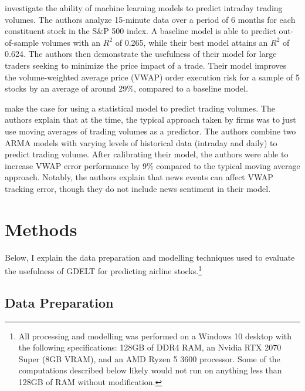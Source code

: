 \documentclass[12pt]{article}
\begin{document}
\cite{cucuringu2025forecasting} investigate the ability of machine learning models to predict intraday trading volumes. The authors analyze 15-minute data over a period of 6 months for each constituent stock in the S\&P 500 index. A baseline model is able to predict out-of-sample volumes with an $R^2$ of 0.265, while their best model attains an $R^2$ of 0.624. The authors then demonstrate the usefulness of their model for large traders seeking to minimize the price impact of a trade. Their model improves the volume-weighted average price (VWAP) order execution risk for a sample of 5 stocks by an average of around 29\%, compared to a baseline model.

\cite{satish2014predicting} make the case for using a statistical model to predict trading volumes. The authors explain that at the time,  the typical approach taken by firms was to just use moving averages of trading volumes as a predictor. The authors combine two ARMA models with varying levels of historical data (intraday and daily) to predict trading volume. After calibrating their model, the authors were able to increase VWAP error performance by 9\% compared to the typical moving average approach. Notably, the authors explain that news events can affect VWAP tracking error, though they do not include news sentiment in their model.

\section{Methods}
Below, I explain the data preparation and modelling techniques used to evaluate the usefulness of GDELT for predicting airline stocks.\footnote{All processing and modelling was performed on a Windows 10 desktop with the following specifications: 128GB of DDR4 RAM, an Nvidia RTX 2070 Super (8GB VRAM), and an AMD Ryzen 5 3600 processor. Some of the computations described below likely would not run on anything less than 128GB of RAM without modification.}
\subsection{Data Preparation}
\end{document}
